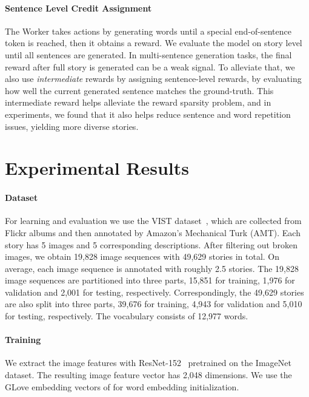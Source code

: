 \documentclass[letterpaper]{article} \usepackage{aaai19}  \usepackage{times}  \usepackage{helvet}  \usepackage{courier}  \usepackage{url}  \usepackage{graphicx}
\begin{document}
\paragraph{Sentence Level Credit Assignment}
The Worker takes actions by generating words until a special end-of-sentence token is reached, then it obtains a reward. We evaluate the model on story level until all sentences are generated.  
In multi-sentence generation tasks, the final reward after full story is generated can be a weak signal. To alleviate that, we also use \emph{intermediate} rewards by assigning sentence-level rewards, by evaluating how well the current generated sentence matches the ground-truth. 
This intermediate reward helps alleviate the reward sparsity problem, and in experiments, we found that it also helps reduce sentence and word repetition issues, yielding more diverse stories.

\section{Experimental Results}
\label{sec:ExperimentalResults}
\paragraph{Dataset}\label{subsec:Dataset}
For learning and evaluation we use the VIST dataset~\cite{huang2016visual}, which are collected from Flickr albums and then annotated by Amazon's Mechanical Turk (AMT). Each story has 5 images and 5 corresponding descriptions. After filtering out broken images, we obtain 19,828 image sequences with 49,629 stories in total. On average, each image sequence is annotated with roughly 2.5 stories. The 19,828 image sequences are partitioned into three parts, 15,851 for training, 1,976 for validation and 2,001 for testing, respectively. Correspondingly, the 49,629 stories are also split into three parts, 39,676 for training, 4,943 for validation and 5,010 for testing, respectively. The vocabulary consists of 12,977 words. 


\paragraph{Training}\label{subsec:Training}
We extract the image features with ResNet-152~\cite{he2016deep} pretrained on the
ImageNet dataset. The resulting image feature vector  has 2,048 dimensions.
We use the GLove embedding vectors of \cite{pennington2014glove} for word embedding initialization.
\end{document}
